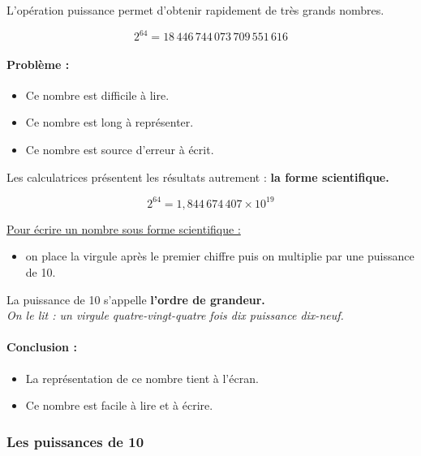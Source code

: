 \documentclass[12pt]{article}
\begin{document}
\begin{multicols}{2}

  L'opération puissance permet d'obtenir rapidement de très grands nombres.

  $$2^{64} = 18 \, 446 \, 744 \, 073 \, 709 \, 551 \, 616$$

  \paragraph{Problème :}

  \begin{itemize}
  \item Ce nombre est difficile à lire.
  \item Ce nombre est long à représenter.
  \item Ce nombre est source d'erreur à écrit.
  \end{itemize}

  Les calculatrices présentent les résultats autrement : \textbf{la forme scientifique.}

  $$2^{64} = 1,844 \, 674 \, 407 \times 10^{19}$$

  \underline{Pour écrire un nombre sous forme scientifique :} \\
  \begin{itemize}
  \item on place la virgule après le premier chiffre puis on multiplie par une puissance de 10. \\
  \end{itemize}

  La puissance de 10 s'appelle \textbf{l'ordre de grandeur.}\\
  \textit{On le lit : un virgule quatre-vingt-quatre fois dix puissance dix-neuf.}

  \paragraph{Conclusion :}

  \begin{itemize}
  \item La représentation de ce nombre tient à l'écran.
  \item Ce nombre est facile à lire et à écrire.
  \end{itemize}

  \subsubsection*{Les puissances de 10}


\end{multicols}
\end{document}
